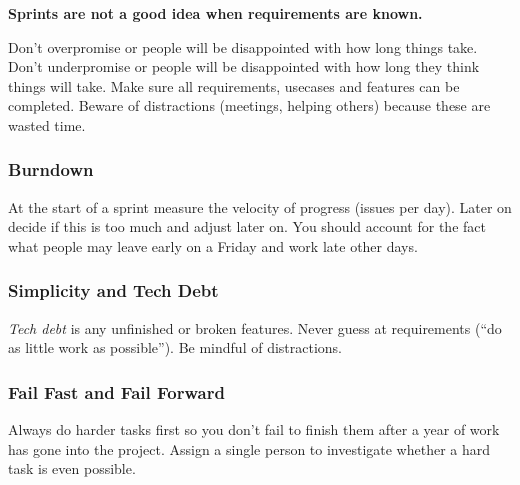 \medskip
\noindent
\textbf{Sprints are not a good idea when requirements are known.}

\medskip
\noindent
Don't overpromise or people will be disappointed with how long things take.
Don't underpromise or people will be disappointed with how long they think things will take.
Make sure all requirements, usecases and features can be completed.
Beware of distractions (meetings, helping others) because these are wasted time.

\subsubsection{Burndown}\label{sub:burndown}

At the start of a sprint measure the velocity of progress (issues per day).
Later on decide if this is too much and adjust later on.
You should account for the fact what people may leave early on a Friday and work late other days.

\subsubsection{Simplicity and Tech Debt}\label{sub:simplicity_and_tech_debt}

\emph{Tech debt} is any unfinished or broken features.
Never guess at requirements (``do as little work as possible'').
Be mindful of distractions.

\subsubsection{Fail Fast and Fail Forward}\label{sub:fail_fast_and_fail_forward}

Always do harder tasks first so you don't fail to finish them after a year of work has gone into the project.
Assign a single person to investigate whether a hard task is even possible.

